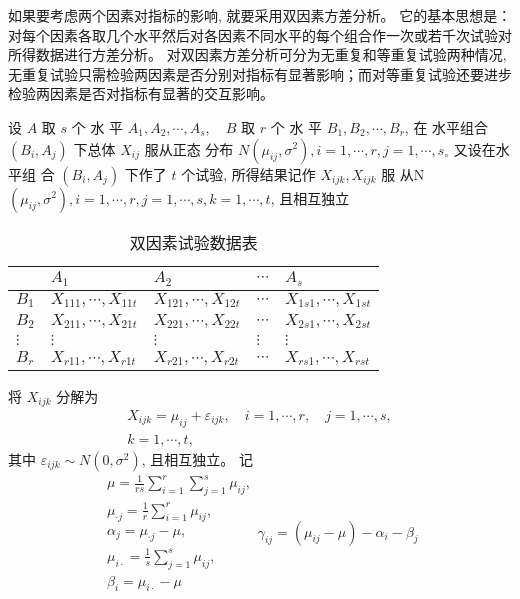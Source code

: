 如果要考虑两个因素对指标的影响, 就要采用双因素方差分析。 它的基本思想是：对每个因素各取几个水平然后对各因素不同水平的每个组合作一次或若千次试验对所得数据进行方差分析。 对双因素方差分析可分为无重复和等重复试验两种情况, 无重复试验只需检验两因素是否分别对指标有显著影响；而对等重复试验还要进步检验两因素是否对指标有显著的交互影响。 

设 \( {A} \) 取 \( {s} \) 个 水 平 \( {A}_{{1}}, {A}_{2}, \cdots, {A}_{s}, \quad {B} \) 取 \( {r} \) 个 水 平
\( {B}_{1}, {B}_{2}, \cdots, {B}_{r} \), 在 水平组合 \( \left({B}_{i}, {A}_{j}\right) \) 下总体 \( {X}_{i j} \) 服从正态
分布 \( N\left(\mu_{i j}, \sigma^{2}\right), i=1, \cdots, r, j=1, \cdots, s_{\circ} \) 又设在水平组
合 \( \left({B}_{i}, {A}_{j}\right) \) 下作了 \( {t} \) 个试验, 所得结果记作 \( {X}_{i j k}, {X}_{i j k} \) 服
从N \( \left(\mu_{i j}, \sigma^{2}\right), i=1, \cdots, r, j=1, \cdots, s, k=1, \cdots, t \), 且相互独立

\begin{table}
        \caption{双因素试验数据表}
        \begin{tabular}{l|llll}
        \hline & \( A_{1} \) & \( A_{2} \) & \( \cdots \) & \( A_{s} \) \\
        \hline \( {B}_{1} \) & \( X_{111}, \cdots, X_{11 t} \) & \( X_{121}, \cdots, X_{12 t} \) & \( \cdots \) & \( X_{1 s 1}, \cdots, X_{1 s t} \) \\
        \( B_{2} \) & \( X_{211}, \cdots, X_{21 t} \) & \( X_{221}, \cdots, X_{22 t} \) & \( \cdots \) & \( X_{2 s 1}, \cdots, X_{2 s t} \) \\
        \( \vdots \) & \( \vdots \) & \( \vdots \) & \( \vdots \) & \( \vdots \) \\
        \( B_{r} \) & \( X_{r 11}, \cdots, X_{r 1 t} \) & \( X_{r 21}, \cdots, X_{r 2 t} \) & \( \cdots \) & \( X_{r s 1}, \cdots, X_{r s t} \) \\
        \hline
        \end{tabular}
\end{table}

将 \( {X}_{i j k} \) 分解为
$$
\begin{array}{c}
X_{i j k}=\mu_{i j}+\varepsilon_{i j k}, \quad i=1, \cdots, r, \quad j=1, \cdots, s, \\
k=1, \cdots, t,
\end{array}
$$
其中 \( \varepsilon_{i j k} \sim N\left(0, \sigma^{2}\right) \), 且相互独立。  记
$$
\begin{array}{l}
\mu=\frac{1}{r s} \sum_{i=1}^{r} \sum_{j=1}^{s} \mu_{i j}, \\ \mu_{\cdot j}=\frac{1}{r} \sum_{i=1}^{r} \mu_{i j}, \\
 \alpha_{j}=\mu_{\cdot j}-\mu, \\
\mu_{i \cdot}=\frac{1}{s} \sum_{j=1}^{s} \mu_{i j} ,\\ 
 \beta_{i}=\mu_{i \cdot}-\mu
\end{array}
\gamma_{i j}=\left(\mu_{i j}-\mu\right)-\alpha_{i}-\beta_{j}
$$

